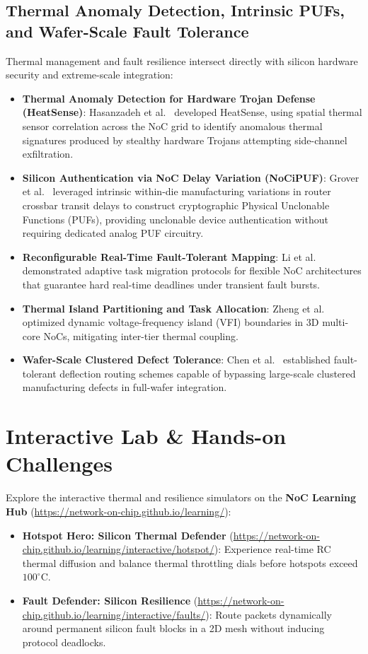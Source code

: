 \subsection{Thermal Anomaly Detection, Intrinsic PUFs, and Wafer-Scale Fault Tolerance}
\label{sec:ch7_security_waferscale}
Thermal management and fault resilience intersect directly with silicon hardware security and extreme-scale integration:
\begin{itemize}
    \item \textbf{Thermal Anomaly Detection for Hardware Trojan Defense (HeatSense)}: Hasanzadeh et al.~\cite{Hasanzadeh2026Heat} developed HeatSense, using spatial thermal sensor correlation across the NoC grid to identify anomalous thermal signatures produced by stealthy hardware Trojans attempting side-channel exfiltration.
    \item \textbf{Silicon Authentication via NoC Delay Variation (NoCiPUF)}: Grover et al.~\cite{Grover2025PUF} leveraged intrinsic within-die manufacturing variations in router crossbar transit delays to construct cryptographic Physical Unclonable Functions (PUFs), providing unclonable device authentication without requiring dedicated analog PUF circuitry.
    \item \textbf{Reconfigurable Real-Time Fault-Tolerant Mapping}: Li et al.~\cite{Li2026Reconfig} demonstrated adaptive task migration protocols for flexible NoC architectures that guarantee hard real-time deadlines under transient fault bursts.
    \item \textbf{Thermal Island Partitioning and Task Allocation}: Zheng et al.~\cite{Zheng2025Thermal} optimized dynamic voltage-frequency island (VFI) boundaries in 3D multi-core NoCs, mitigating inter-tier thermal coupling.
    \item \textbf{Wafer-Scale Clustered Defect Tolerance}: Chen et al.~\cite{Chen2025Wafer} established fault-tolerant deflection routing schemes capable of bypassing large-scale clustered manufacturing defects in full-wafer integration.
\end{itemize}

\section{Interactive Lab \& Hands-on Challenges}
\label{sec:ch7_interactive}

Explore the interactive thermal and resilience simulators on the \textbf{NoC Learning Hub} (\url{https://network-on-chip.github.io/learning/}):
\begin{itemize}
    \item \textbf{Hotspot Hero: Silicon Thermal Defender} (\url{https://network-on-chip.github.io/learning/interactive/hotspot/}): Experience real-time RC thermal diffusion and balance thermal throttling dials before hotspots exceed $100^\circ\mathrm{C}$.
    \item \textbf{Fault Defender: Silicon Resilience} (\url{https://network-on-chip.github.io/learning/interactive/faults/}): Route packets dynamically around permanent silicon fault blocks in a 2D mesh without inducing protocol deadlocks.
\end{itemize}

